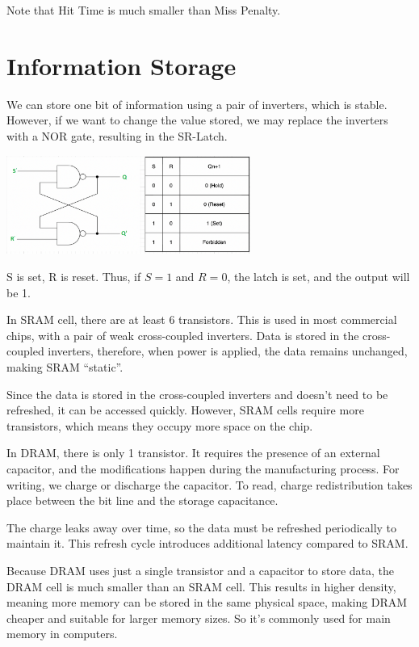 \begin{remark}
  Note that Hit Time is much smaller than Miss Penalty.
\end{remark}

\section{Information Storage}
We can store one bit of information using a pair of inverters, which is stable. However, if we want to change the value stored, we may replace the inverters with a NOR gate, resulting in the SR-Latch.

\begin{center}
  \includegraphics[width=0.6\textwidth]{Figure/SR_latch.png}
\end{center}

\begin{remark}
  S is set, R is reset. Thus, if \(S = 1\) and \(R = 0\), the latch is set, and the output will be 1.
\end{remark}

In SRAM cell, there are at least 6 transistors. This is used in most commercial chips, with a pair of weak cross-coupled inverters. Data is stored in the cross-coupled inverters, therefore, when power is applied, the data remains unchanged, making SRAM ``static''.

Since the data is stored in the cross-coupled inverters and doesn't need to be refreshed, it can be accessed quickly. However, SRAM cells require more transistors, which means they occupy more space on the chip.

In DRAM, there is only 1 transistor. It requires the presence of an external capacitor, and the modifications happen during the manufacturing process. For writing, we charge or discharge the capacitor. To read, charge redistribution takes place between the bit line and the storage capacitance.

The charge leaks away over time, so the data must be refreshed periodically to maintain it. This refresh cycle introduces additional latency compared to SRAM.

Because DRAM uses just a single transistor and a capacitor to store data, the DRAM cell is much smaller than an SRAM cell. This results in higher density, meaning more memory can be stored in the same physical space, making DRAM cheaper and suitable for larger memory sizes. So it’s commonly used for main memory in computers.

